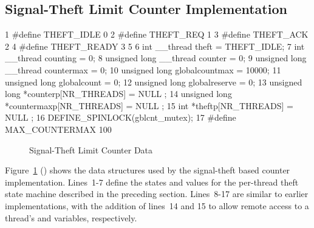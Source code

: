 \subsection{Signal-Theft Limit Counter Implementation}
\label{sec:count:Signal-Theft Limit Counter Implementation}

{ \scriptsize
\begin{verbbox}
  1 #define THEFT_IDLE  0
  2 #define THEFT_REQ   1
  3 #define THEFT_ACK   2
  4 #define THEFT_READY 3
  5 
  6 int __thread theft = THEFT_IDLE;
  7 int __thread counting = 0;
  8 unsigned long __thread counter = 0;
  9 unsigned long __thread countermax = 0;
 10 unsigned long globalcountmax = 10000;
 11 unsigned long globalcount = 0;
 12 unsigned long globalreserve = 0;
 13 unsigned long *counterp[NR_THREADS] = { NULL };
 14 unsigned long *countermaxp[NR_THREADS] = { NULL };
 15 int *theftp[NR_THREADS] = { NULL };
 16 DEFINE_SPINLOCK(gblcnt_mutex);
 17 #define MAX_COUNTERMAX 100
\end{verbbox}
}
\begin{figure}[tbp]
\centering
\theverbbox
\caption{Signal-Theft Limit Counter Data}
\label{fig:count:Signal-Theft Limit Counter Data}
\end{figure}

Figure~\ref{fig:count:Signal-Theft Limit Counter Data}
()
shows the data structures used by the signal-theft based counter
implementation.
Lines~1-7 define the states and values for the per-thread theft state machine
described in the preceding section.
Lines~8-17 are similar to earlier implementations, with the addition of
lines~14 and 15 to allow remote access to a thread's 
and  variables, respectively.

